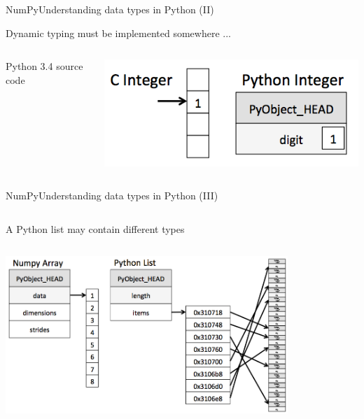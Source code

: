 \documentclass[10pt,compress]{beamer} %
\begin{document}
\begin{frame}{NumPy}{Understanding data types in Python (II)}

	Dynamic typing must be implemented somewhere ...

    \begin{columns}
			\begin{block}{\footnotesize{Python 3.4 source code}}
			\vspace{-0.2cm} 
				
			\vspace{-0.2cm} 
			\end{block}

			\includegraphics[width=\textwidth]{figs/cint_vs_pyint.png}	
	\end{columns}

\end{frame}

\begin{frame}[fragile]{NumPy}{Understanding data types in Python (III)}
	\begin{columns}
			A Python list may contain different types

	   \begin{exampleblock}{}
			\vspace{-0.2cm} 
			
			\vspace{-0.2cm} 
		\end{exampleblock}
	\end{columns}

	\bigskip

	\centering \includegraphics[width=0.8\textwidth]{figs/array_vs_list.png}	
\end{frame}
\end{document}
